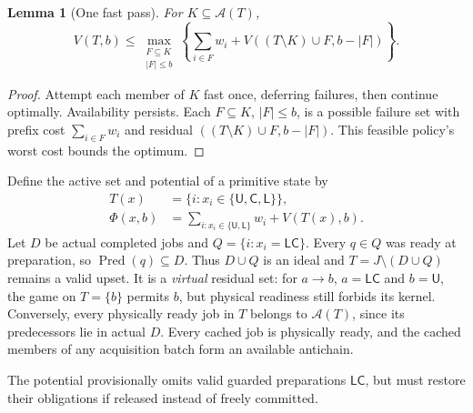 \documentclass[acmsmall,screen,review,anonymous]{acmart}
\newtheorem{lemma}[theorem]{Lemma}
\newcommand{\U}{\mathsf U}
\newcommand{\C}{\mathsf C}
\newcommand{\LL}{\mathsf L}
\newcommand{\LC}{\mathsf{LC}}
\begin{document}
\begin{lemma}[One fast pass]
\label{lem:pass}
For $K\subseteq\mathcal A(T)$,
\begin{equation}
V(T,b)\le
\max_{\substack{F\subseteq K\\|F|\le b}}
\left\{\sum_{i\in F}w_i+
V((T\setminus K)\cup F,b-|F|)\right\}.
\label{eq:pass}
\end{equation}
\end{lemma}
\begin{proof}
Attempt each member of $K$ fast once, deferring failures, then continue optimally. Availability persists. Each $F\subseteq K$, $|F|\le b$, is a possible failure set with prefix cost $\sum_{i\in F}w_i$ and residual $((T\setminus K)\cup F,b-|F|)$. This feasible policy's worst cost bounds the optimum.
\end{proof}

Define the active set and potential of a primitive state by
\begin{align}
T(x)&=\{i:x_i\in\{\U,\C,\LL\}\},\\
\Phi(x,b)&=\sum_{i:x_i\in\{\U,\LL\}}w_i+V(T(x),b).
\label{eq:potential}
\end{align}
Let $D$ be actual completed jobs and $Q=\{i:x_i=\LC\}$. Every $q\in Q$ was ready at preparation, so $\operatorname{Pred}(q)\subseteq D$. Thus $D\cup Q$ is an ideal and $T=J\setminus(D\cup Q)$ remains a valid upset. It is a \emph{virtual} residual set: for $a\to b$, $a=\LC$ and $b=\U$, the game on $T=\{b\}$ permits $b$, but physical readiness still forbids its kernel. Conversely, every physically ready job in $T$ belongs to $\mathcal A(T)$, since its predecessors lie in actual $D$. Every cached job is physically ready, and the cached members of any acquisition batch form an available antichain.

The potential provisionally omits valid guarded preparations $\LC$, but must restore their obligations if released instead of freely committed.
\end{document}
